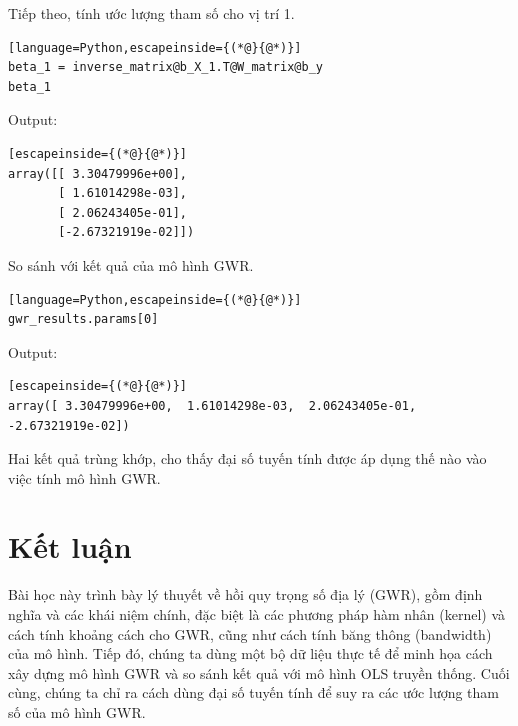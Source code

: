 Tiếp theo, tính ước lượng tham số cho vị trí 1.

\begin{lstlisting}[language=Python,escapeinside={(*@}{@*)}]
beta_1 = inverse_matrix@b_X_1.T@W_matrix@b_y
beta_1
\end{lstlisting}

Output:

\begin{lstlisting}[escapeinside={(*@}{@*)}]
array([[ 3.30479996e+00],
       [ 1.61014298e-03],
       [ 2.06243405e-01],
       [-2.67321919e-02]])
\end{lstlisting}

So sánh với kết quả của mô hình GWR.

\begin{lstlisting}[language=Python,escapeinside={(*@}{@*)}]
gwr_results.params[0]
\end{lstlisting}

Output:

\begin{lstlisting}[escapeinside={(*@}{@*)}]
array([ 3.30479996e+00,  1.61014298e-03,  2.06243405e-01, -2.67321919e-02])
\end{lstlisting}

Hai kết quả trùng khớp, cho thấy đại số tuyến tính được áp dụng thế nào vào việc tính mô hình GWR.

\section{Kết luận}

Bài học này trình bày lý thuyết về hồi quy trọng số địa lý (GWR), gồm định nghĩa và các khái niệm chính, đặc biệt là các phương pháp hàm nhân (kernel) và cách tính khoảng cách cho GWR, cũng như cách tính băng thông (bandwidth) của mô hình. Tiếp đó, chúng ta dùng một bộ dữ liệu thực tế để minh họa cách xây dựng mô hình GWR và so sánh kết quả với mô hình OLS truyền thống. Cuối cùng, chúng ta chỉ ra cách dùng đại số tuyến tính để suy ra các ước lượng tham số của mô hình GWR.
